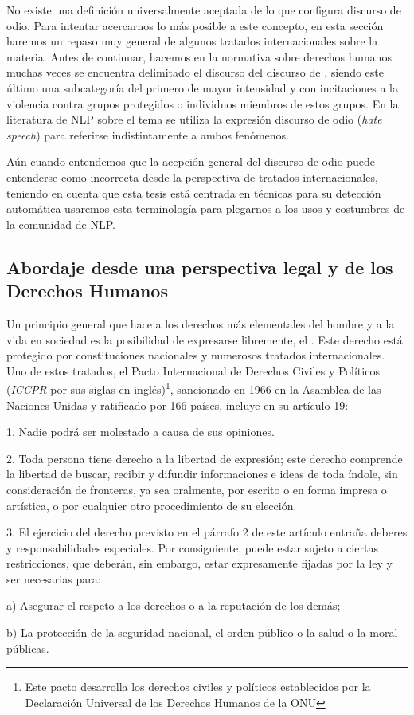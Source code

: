No existe una definición universalmente aceptada de lo que configura discurso de odio. Para intentar acercarnos lo más posible a este concepto, en esta sección haremos un repaso muy general de algunos tratados internacionales sobre la materia. Antes de continuar, hacemos  en la normativa sobre derechos humanos muchas veces se encuentra delimitado el discurso  del discurso de , siendo este último una subcategoría del primero de mayor intensidad y con incitaciones a la violencia contra grupos protegidos o individuos miembros de estos grupos. En la literatura de NLP sobre el tema se utiliza la expresión discurso de odio (\emph{hate speech}) para referirse indistintamente a ambos fenómenos.

Aún cuando entendemos que la acepción general del discurso de odio puede entenderse como incorrecta desde la perspectiva de tratados internacionales, teniendo en cuenta que esta tesis está centrada en técnicas para su detección automática usaremos esta terminología para plegarnos a los usos y costumbres de la comunidad de NLP.

\subsection{Abordaje desde una perspectiva legal y de los Derechos Humanos}

Un principio general que hace a los derechos más elementales del hombre y a la vida en sociedad es la posibilidad de expresarse libremente, el . Este derecho está protegido por constituciones nacionales y numerosos tratados internacionales. Uno de estos tratados, el Pacto Internacional de Derechos Civiles y Políticos (\emph{ICCPR} por sus siglas en inglés)\footnote{Este pacto desarrolla los derechos civiles y políticos establecidos por la Declaración Universal de los Derechos Humanos de la ONU}, sancionado en 1966 en la Asamblea de las Naciones Unidas y ratificado por 166 países, incluye en su artículo 19:

\begin{displayquote}
1. Nadie podrá ser molestado a causa de sus opiniones.

2. Toda persona tiene derecho a la libertad de expresión; este derecho comprende la libertad de buscar, recibir y difundir informaciones e ideas de toda índole, sin consideración de fronteras, ya sea oralmente, por escrito o en forma impresa o artística, o por cualquier otro procedimiento de su elección.

3. El ejercicio del derecho previsto en el párrafo 2 de este artículo entraña deberes y responsabilidades especiales. Por consiguiente, puede estar sujeto a ciertas restricciones, que deberán, sin embargo, estar expresamente fijadas por la ley y ser necesarias para:

a) Asegurar el respeto a los derechos o a la reputación de los demás;

b) La protección de la seguridad nacional, el orden público o la salud o la moral públicas.
\end{displayquote}


